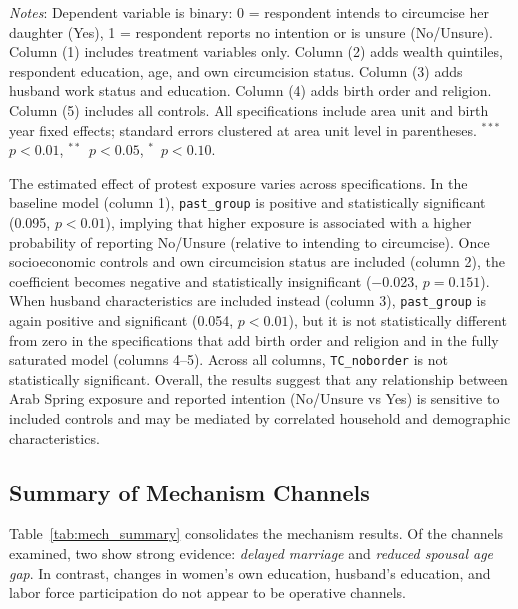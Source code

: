 \documentclass[12pt,a4paper]{article}
\begin{document}
\begin{table}[H]
\begin{threeparttable}
\begin{tablenotes}[flushleft]
\footnotesize
\item \textit{Notes}: Dependent variable is binary: 0 = respondent intends to circumcise her daughter (Yes), 1 = respondent reports no intention or is unsure (No/Unsure). Column (1) includes treatment variables only. Column (2) adds wealth quintiles, respondent education, age, and own circumcision status. Column (3) adds husband work status and education. Column (4) adds birth order and religion. Column (5) includes all controls. All specifications include area unit and birth year fixed effects; standard errors clustered at area unit level in parentheses. $^{***}$~$p<0.01$, $^{**}$~$p<0.05$, $^{*}$~$p<0.10$.
\end{tablenotes}
\end{threeparttable}
\end{table}

\noindent The estimated effect of protest exposure varies across specifications. In the baseline model (column 1), \texttt{past\_group} is positive and statistically significant (0.095, $p<0.01$), implying that higher exposure is associated with a higher probability of reporting No/Unsure (relative to intending to circumcise). Once socioeconomic controls and own circumcision status are included (column 2), the coefficient becomes negative and statistically insignificant ($-$0.023, $p=0.151$). When husband characteristics are included instead (column 3), \texttt{past\_group} is again positive and significant (0.054, $p<0.01$), but it is not statistically different from zero in the specifications that add birth order and religion and in the fully saturated model (columns 4--5). Across all columns, \texttt{TC\_noborder} is not statistically significant. Overall, the results suggest that any relationship between Arab Spring exposure and reported intention (No/Unsure vs Yes) is sensitive to included controls and may be mediated by correlated household and demographic characteristics.

\vspace{0.25cm}


\subsection{Summary of Mechanism Channels}

Table~\ref{tab:mech_summary} consolidates the mechanism results. Of the channels examined, two show strong evidence: \textit{delayed marriage} and \textit{reduced spousal age gap}. In contrast, changes in women's own education, husband's education, and labor force participation do not appear to be operative channels.
\vspace{0.25cm}
\end{document}

